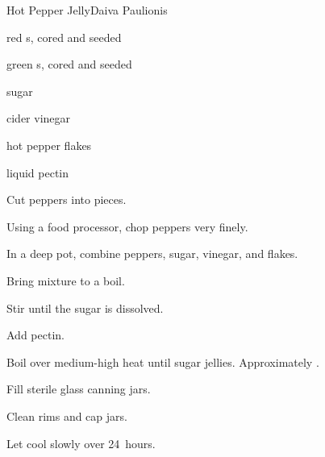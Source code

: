\begin{recipe}{Hot Pepper Jelly}{Daiva Paulionis}{}

\begin{ingredients}
\item {} red s, cored and seeded
\item \lbs{\half} green s, cored and seeded
\item \C{6\half} sugar
\item \C{1\half} cider vinegar
\item \tp{\half} hot pepper flakes
\item {} liquid pectin
\end{ingredients}

\begin{directions}
\item Cut peppers into  pieces.
\item Using a food processor, chop peppers very finely.
\item In a deep pot, combine peppers, sugar, vinegar, and flakes.
\item Bring mixture to a boil.
\item Stir until the sugar is dissolved.
\item Add pectin.
\item Boil over medium-high heat until sugar jellies. Approximately .
\item Fill sterile glass canning jars.
\item Clean rims and cap jars.
\item Let cool slowly over 24~hours.
\end{directions}

\end{recipe}
